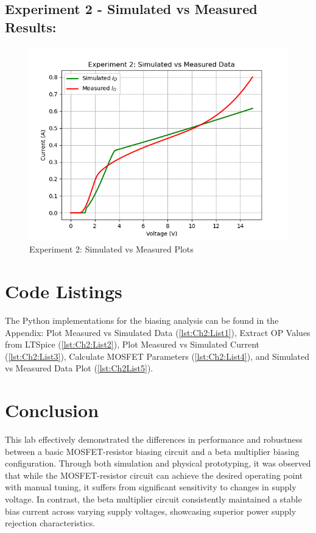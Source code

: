 \subsection{Experiment 2 - Simulated vs Measured Results:}

\begin{center}
	\begin{figure}[ht]
		\centering
		\includegraphics[scale=0.4]{Chapter_2/Lab_02_Exp_2_Sim_vs_Meas_Plot_FINAL.png} 
		\caption{Experiment 2: Simulated vs Measured Plots}
		\label{Ch2fig:3}
	\end{figure}
\end{center}

\section{Code Listings}

The Python implementations for the biasing analysis can be found in the Appendix: Plot Measured vs Simulated Data (\cref{lst:Ch2:List1}), Extract OP Values from LTSpice (\cref{lst:Ch2:List2}), Plot Measured vs Simulated Current (\cref{lst:Ch2:List3}), Calculate MOSFET Parameters (\cref{lst:Ch2:List4}), and Simulated vs Measured Data Plot (\cref{lst:Ch2List5}).

\section{Conclusion}
\justifying
This lab effectively demonstrated the differences in performance and robustness between a basic MOSFET-resistor biasing circuit and a beta multiplier biasing configuration. Through both simulation and physical prototyping, it was observed that while the MOSFET-resistor circuit can achieve the desired operating point with manual tuning, it suffers from significant sensitivity to changes in supply voltage. In contrast, the beta multiplier circuit consistently maintained a stable bias current across varying supply voltages, showcasing superior power supply rejection characteristics.

